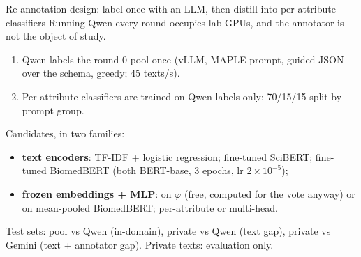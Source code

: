 \documentclass[11pt,aspectratio=169]{beamer}
\begin{document}
\begin{frame}{Re-annotation design: label once with an LLM, then distill into per-attribute classifiers}
Running Qwen every round occupies lab GPUs, and the annotator is not the object of study.
\begin{enumerate}
  \item Qwen labels the round-0 pool once (vLLM, MAPLE prompt, guided JSON over the schema, greedy; 45 texts/s).
  \item Per-attribute classifiers are trained on Qwen labels only; 70/15/15 split by prompt group.
\end{enumerate}

\medskip
Candidates, in two families:
\begin{itemize}
  \item \textbf{text encoders}: TF-IDF + logistic regression; fine-tuned SciBERT; fine-tuned BiomedBERT (both BERT-base, 3 epochs, lr $2\!\times\!10^{-5}$);
  \item \textbf{frozen embeddings + MLP}: on $\varphi$ (free, computed for the vote anyway) or on mean-pooled BiomedBERT; per-attribute or multi-head.
\end{itemize}

\medskip
Test sets: pool vs Qwen (in-domain), private vs Qwen (text gap), private vs Gemini (text + annotator gap). Private texts: evaluation only.
\end{frame}
\end{document}
